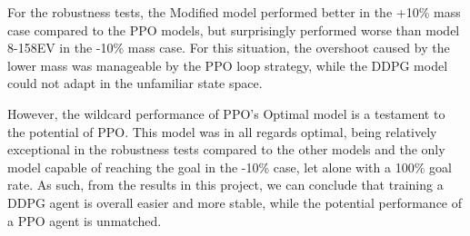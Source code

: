 For the robustness tests, the Modified model performed better in the +10\% mass case compared to the PPO models, but surprisingly performed worse than model 8-158EV in the -10\% mass case. For this situation, the overshoot caused by the lower mass was manageable by the PPO loop strategy, while the DDPG model could not adapt in the unfamiliar state space.

However, the wildcard performance of PPO's Optimal model is a testament to the potential of PPO. This model was in all regards optimal, being relatively exceptional in the robustness tests compared to the other models and the only model capable of reaching the goal in the -10\% case, let alone with a 100\% goal rate. As such, from the results in this project, we can conclude that training a DDPG agent is overall easier and more stable, while the potential performance of a PPO agent is unmatched.


